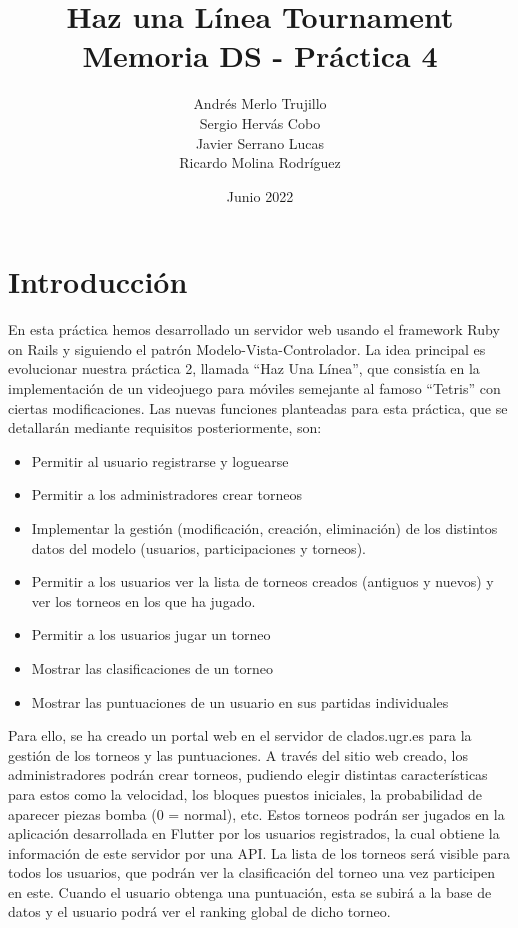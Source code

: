 \documentclass{article}
\title{Haz una Línea Tournament\\
\large Memoria DS - Práctica 4}
\author{Andrés Merlo Trujillo\\ Sergio Hervás Cobo\\ Javier Serrano Lucas\\ Ricardo Molina Rodríguez}
\begin{document}
\date{Junio 2022}
\maketitle
\tableofcontents

\newpage

\section{Introducción}

En esta práctica hemos desarrollado un servidor web usando el framework Ruby on Rails y siguiendo el patrón Modelo-Vista-Controlador. La idea principal
es evolucionar nuestra práctica 2, llamada ``Haz Una Línea'', que consistía en la implementación de un videojuego para móviles semejante al famoso ``Tetris'' con ciertas modificaciones.
Las nuevas funciones planteadas para esta práctica, que se detallarán mediante requisitos posteriormente, son:
\begin{itemize}
\item Permitir al usuario registrarse y loguearse
\item Permitir a los administradores crear torneos
\item Implementar la gestión (modificación, creación, eliminación) de los distintos datos del modelo (usuarios, participaciones y torneos).
\item Permitir a los usuarios ver la lista de torneos creados (antiguos y nuevos) y ver los torneos en los que ha jugado.
\item Permitir a los usuarios jugar un torneo
\item Mostrar las clasificaciones de un torneo
\item Mostrar las puntuaciones de un usuario en sus partidas individuales
\end{itemize}


Para ello, se ha creado un portal web en el servidor de clados.ugr.es para la gestión de los torneos y las puntuaciones. A través del sitio web creado,
los administradores podrán crear torneos, pudiendo elegir distintas características para estos como la velocidad, los bloques puestos iniciales, la
 probabilidad de aparecer piezas bomba (0 = normal), etc. Estos torneos podrán ser jugados en la aplicación desarrollada en Flutter por los usuarios registrados,
 la cual obtiene la información de este servidor por una API. La lista de los torneos será visible para todos los usuarios, que podrán ver la clasificación del torneo una
 vez participen en este. Cuando el usuario obtenga una puntuación, esta se subirá a la base de datos y el usuario podrá ver el ranking global de dicho torneo.
 
\end{document}
